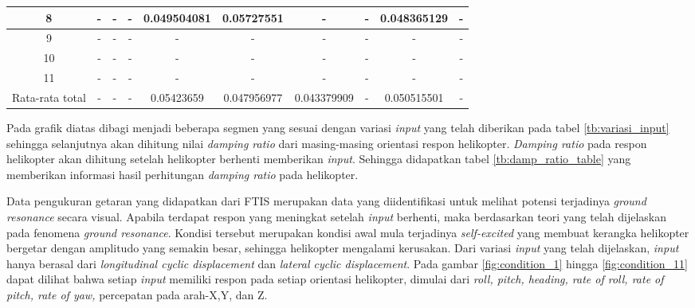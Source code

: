 \begin{table}[H]
{\begin{tabular}{|c|ccccccccc|}
			8 & \multicolumn{1}{c|}{-} & \multicolumn{1}{c|}{-} & \multicolumn{1}{c|}{-} & \multicolumn{1}{c|}{0.049504081} & \multicolumn{1}{c|}{0.05727551} & \multicolumn{1}{c|}{-} & \multicolumn{1}{c|}{-} & \multicolumn{1}{c|}{0.048365129} & - \\ \hline
			9 & \multicolumn{1}{c|}{-} & \multicolumn{1}{c|}{-} & \multicolumn{1}{c|}{-} & \multicolumn{1}{c|}{-} & \multicolumn{1}{c|}{-} & \multicolumn{1}{c|}{-} & \multicolumn{1}{c|}{-} & \multicolumn{1}{c|}{-} & - \\ \hline
			10 & \multicolumn{1}{c|}{-} & \multicolumn{1}{c|}{-} & \multicolumn{1}{c|}{-} & \multicolumn{1}{c|}{-} & \multicolumn{1}{c|}{-} & \multicolumn{1}{c|}{-} & \multicolumn{1}{c|}{-} & \multicolumn{1}{c|}{-} & - \\ \hline
			11 & \multicolumn{1}{c|}{-} & \multicolumn{1}{c|}{-} & \multicolumn{1}{c|}{-} & \multicolumn{1}{c|}{-} & \multicolumn{1}{c|}{-} & \multicolumn{1}{c|}{-} & \multicolumn{1}{c|}{-} & \multicolumn{1}{c|}{-} & - \\ \hline
			Rata-rata total & \multicolumn{1}{c|}{-} & \multicolumn{1}{c|}{-} & \multicolumn{1}{c|}{-} & \multicolumn{1}{c|}{0.05423659} & \multicolumn{1}{c|}{0.047956977} & \multicolumn{1}{c|}{0.043379909} & \multicolumn{1}{c|}{-} & \multicolumn{1}{c|}{0.050515501} & - \\ \hline
		\end{tabular}%
	}
\end{table}

Pada grafik diatas dibagi menjadi beberapa segmen yang sesuai dengan variasi \textit{input} yang telah diberikan pada tabel \ref{tb:variasi_input} sehingga selanjutnya akan dihitung nilai \textit{damping ratio} dari masing-masing orientasi respon helikopter. \textit{Damping ratio} pada respon helikopter akan dihitung setelah helikopter berhenti memberikan \textit{input}. Sehingga didapatkan tabel \ref{tb:damp_ratio_table} yang memberikan informasi hasil perhitungan \textit{damping ratio} pada helikopter.

Data pengukuran getaran yang didapatkan dari FTIS merupakan data yang diidentifikasi untuk melihat potensi terjadinya \textit{ground resonance} secara visual. Apabila terdapat respon yang meningkat setelah \textit{input} berhenti, maka berdasarkan teori yang telah dijelaskan pada fenomena \textit{ground resonance}. Kondisi tersebut merupakan kondisi awal mula terjadinya \textit{self-excited} yang membuat kerangka helikopter bergetar dengan amplitudo yang semakin besar, sehingga helikopter mengalami kerusakan. Dari variasi \textit{input} yang telah dijelaskan, \textit{input} hanya berasal dari \textit{longitudinal cyclic displacement} dan \textit{lateral cyclic displacement}. Pada gambar \ref{fig:condition_1} hingga \ref{fig:condition_11} dapat dilihat bahwa setiap \textit{input} memiliki respon pada setiap orientasi helikopter, dimulai dari \textit{roll, pitch, heading, rate of roll, rate of pitch, rate of yaw,} percepatan pada arah-X,Y, dan Z. 

